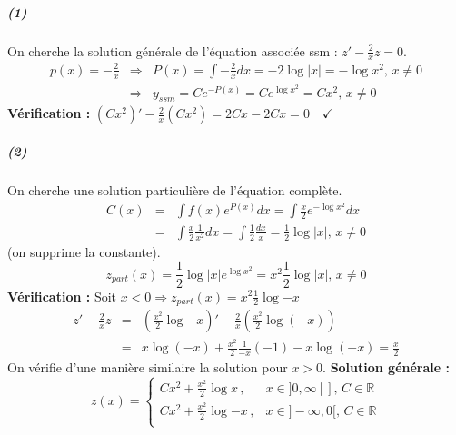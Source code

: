 \message{ !name(analyse-02.tex)}\documentclass[1Opt]{report}
\begin{document}
\subparagraph{(1)}
On cherche la solution générale de l'équation associée ssm : $z'-\frac{2}{x}z=0$.
\begin{eqnarray*}
  p(x)=-\frac{2}{x} & \Rightarrow & P(x)=\int{-\frac{2}{x}dx}=-2\log{|x|}=
-\log{x^2},\,x\neq0\\
  & \Rightarrow & y_{ssm}=Ce^{-P(x)}=Ce^{\log{x^2}}=Cx^2,\,x\neq0
\end{eqnarray*}
\textbf{Vérification :} $(Cx^2)'-\frac{2}{x}(Cx^2)=2Cx-2Cx=0\quad\checkmark$

\subparagraph{(2)}
On cherche une solution particulière de l'équation complète.
\begin{eqnarray*}
C(x)&=&\int{f(x)e^{P(x)}dx}=\int{\frac{x}{2}e^{-\log{x^2}}dx}\\
&=&\int{\frac{x}{2}\frac{1}{x^2}dx}=\int{\frac{1}{2}\frac{dx}{x}}=\frac{1}{2}
\log{|x|},\,x\neq0
\end{eqnarray*}
(on supprime la constante).
\[z_{part}(x)=\frac{1}{2}\log{|x|}e^{\log{x^2}}=x^2\frac{1}{2}\log{|x|}
,\,x\neq0\]
\textbf{Vérification :} Soit $x<0\Rightarrow z_{part}(x)=x^2\frac{1}{2}\log{-x}$
\begin{eqnarray*}
  z'-\frac{2}{x}z&=&(\frac{x^2}{2}\log{-x})'-\frac{2}{x}(\frac{x^2}{2}\log{(-x)})\\
  &=&x\log{(-x)}+\frac{x^2}{2}\frac{1}{-x}(-1)-x\log{(-x)}=\frac{x}{2}
\end{eqnarray*}
On vérifie d'une manière similaire la solution pour $x>0$.
\textbf{Solution générale :}
\[z(x) = \left\{
  \begin{array}{lr}
    Cx^2+\frac{x^2}{2}\log{x}\, , & x\in]0,\infty[],\,C\in\mathbb{R}\\
    Cx^2+\frac{x^2}{2}\log{-x}\, , & x\in]-\infty,0[,\,C\in\mathbb{R}\\
  \end{array}
\right.
\]
\end{document}
